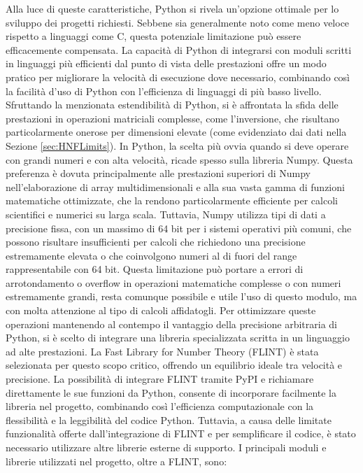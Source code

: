 Alla luce di queste caratteristiche, Python si rivela un'opzione ottimale per lo sviluppo 
dei progetti richiesti. Sebbene sia generalmente noto come meno veloce rispetto a 
linguaggi come C, questa potenziale limitazione può essere efficacemente compensata. 
La capacità di Python di integrarsi con moduli scritti in linguaggi più efficienti dal 
punto di vista delle prestazioni offre un modo pratico per migliorare la velocità di 
esecuzione dove necessario, combinando così la facilità d'uso di Python con l'efficienza 
di linguaggi di più basso livello.
Sfruttando la menzionata estendibilità di Python, si è affrontata la sfida delle prestazioni 
in operazioni matriciali complesse, come l'inversione, che risultano particolarmente onerose 
per dimensioni elevate (come evidenziato dai dati nella Sezione \ref{sec:HNFLimits}). 
In Python, la scelta più ovvia quando si deve operare con grandi numeri e con alta velocità,
ricade spesso sulla libreria Numpy. 
Questa preferenza è dovuta principalmente alle prestazioni superiori di Numpy nell'elaborazione 
di array multidimensionali e alla sua vasta gamma di funzioni matematiche ottimizzate, 
che la rendono particolarmente efficiente per calcoli scientifici e numerici su larga scala. 
Tuttavia, Numpy utilizza tipi di dati a precisione fissa, con un massimo di 64 bit per i 
sistemi operativi più comuni, che 
possono risultare insufficienti per calcoli che richiedono una precisione estremamente 
elevata o che coinvolgono numeri al di fuori del range rappresentabile con 64 bit. 
Questa limitazione può portare a errori di arrotondamento o overflow in operazioni 
matematiche complesse o con numeri estremamente grandi, resta comunque possibile e utile
l'uso di questo modulo, ma con molta attenzione al tipo di calcoli affidatogli.
Per ottimizzare queste operazioni mantenendo al contempo il vantaggio della precisione 
arbitraria di Python, si è scelto di integrare una libreria specializzata scritta in un 
linguaggio ad alte prestazioni. La Fast Library for Number Theory \cite{FLINT} (FLINT) è stata 
selezionata per questo scopo critico, offrendo un equilibrio ideale tra velocità e 
precisione.
La possibilità di integrare FLINT tramite PyPI e richiamare direttamente le sue funzioni 
da Python, consente di incorporare facilmente la libreria nel progetto, combinando così 
l'efficienza computazionale con la flessibilità e la leggibilità del codice Python. 
Tuttavia, a causa delle limitate funzionalità offerte dall'integrazione di FLINT e per 
semplificare il codice, è stato necessario utilizzare altre librerie esterne di supporto.
I principali moduli e librerie utilizzati nel progetto, oltre a FLINT, sono:


